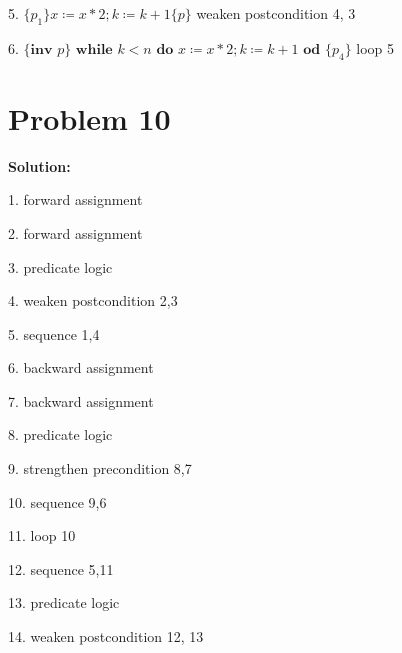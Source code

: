 \documentclass{article}
\begin{document}
5. $ \{p_1\}x \coloneqq x*2;k \coloneqq k+1\{p\} $ \qquad \qquad \qquad \qquad \qquad \qquad \qquad weaken postcondition 4, 3

6. $ \{ \textbf{inv } p\} \textbf{ while } k<n \textbf{ do } x \coloneqq x*2;k \coloneqq k+1 \textbf{ od }\{p_4\} $ \qquad \quad loop 5


\section*{Problem 10}

\textbf{Solution: } 

1. forward assignment

2. forward assignment

3. predicate logic

4. weaken postcondition 2,3

5. sequence 1,4

6. backward assignment

7. backward assignment

8. predicate logic

9. strengthen precondition 8,7

10. sequence 9,6

11. loop 10

12. sequence 5,11

13. predicate logic

14. weaken postcondition 12, 13
\end{document}
